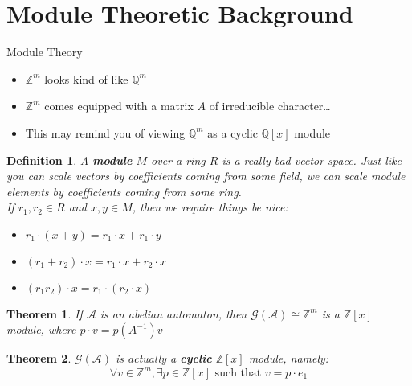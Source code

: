 \documentclass{beamer}
\newtheorem{thm}{Theorem}
\newtheorem{defn}{Definition}
\newcommand{\2}{\textbf{2}}
\newcommand{\A}{\mathcal{A}}
\newcommand{\G}{\mathcal{G}}
\newcommand{\Z}{\mathbb{Z}}
\newcommand{\Q}{\mathbb{Q}}
\begin{document}
\section{Module Theoretic Background}
\begin{frame}{Module Theory}
  \begin{itemize}
    \item $\Z^m$ looks kind of like $\Q^m$
    \item $\Z^m$ comes equipped with a matrix $A$ of irreducible character\ldots
    \item This may remind you of viewing $\Q^m$ as a cyclic $\Q[x]$ module
  \end{itemize}

  \begin{defn}
    A \textbf{module} $M$ over a ring $R$ is a really bad vector space.
    Just like you can scale vectors by coefficients coming from some field, 
    we can scale module elements by coefficients coming from some ring.\\
    If $r_1, r_2 \in R$ and $x,y \in M$, then we require things be nice:
    \begin{itemize}
      \item $r_1 \cdot (x+y) = r_1 \cdot x + r_1 \cdot y$
      \item $(r_1 + r_2) \cdot x = r_1 \cdot x + r_2 \cdot x$
      \item $(r_1r_2) \cdot x = r_1 \cdot (r_2 \cdot x)$
    \end{itemize}
  \end{defn}
\end{frame}

\begin{frame}
  \begin{thm}
    If $\A$ is an abelian automaton, then $\G(\A) \cong \Z^m$ is a $\Z[x]$ 
    module, where $p \cdot v = p(A^{-1})v$
  \end{thm}

  \begin{thm}
    $\G(\A)$ is actually a \textbf{cyclic} $\Z[x]$ module, namely:
    \[
      \forall v \in \Z^m, \exists p \in \Z[x] \text{ such that } v = p \cdot e_1
    \]
  \end{thm}
\end{frame}
\end{document}

